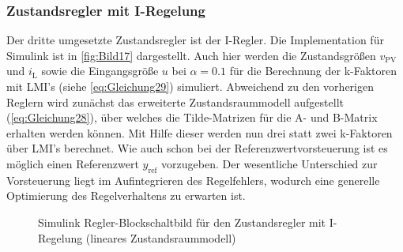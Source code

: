 \subsubsection{Zustandsregler mit I-Regelung}

Der dritte umgesetzte Zustandsregler ist der I-Regler. Die Implementation für Simulink ist in \autoref{fig:Bild17} dargestellt. Auch hier werden die Zustandsgrößen $v_{\mathrm{PV}}$ und $i_{\mathrm{L}}$ sowie die Eingangsgröße $u$ bei $\alpha = 0.1$ für die Berechnung der k-Faktoren mit LMI's (siehe \autoref{eq:Gleichung29}) simuliert. Abweichend zu den vorherigen Reglern wird zunächst das erweiterte Zustandsraummodell aufgestellt (\autoref{eq:Gleichung28}), über welches die Tilde-Matrizen für die A- und B-Matrix erhalten werden können. Mit Hilfe dieser werden nun drei statt zwei k-Faktoren über LMI's berechnet. Wie auch schon bei der Referenzwertvorsteuerung ist es möglich einen Referenzwert $y_{\mathrm{ref}}$ vorzugeben. Der wesentliche Unterschied zur Vorsteuerung liegt im Aufintegrieren des Regelfehlers, wodurch eine generelle Optimierung des Regelverhaltens zu erwarten ist.

\begin{figure}[H]
    \centering
    \caption[Zustandsregler mit I-Regelung Simulink (linear)]{Simulink Regler-Blockschaltbild für den Zustandsregler mit I-Regelung (lineares Zustandsraummodell)}
    \label{fig:Bild17}
\end{figure}

